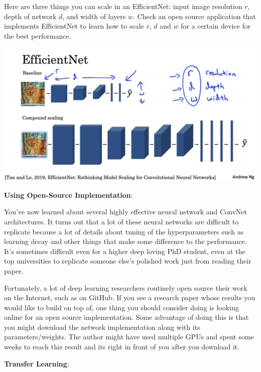 \documentclass{article}
\begin{document}
\bigskip

\noindent Here are three things you can scale in an EfficientNet: input image resolution \(r\), depth of network \(d\), and width of layers \(w\). Check an open source application that implements EfficientNet to learn how to scale \(r\), \(d\) and \(w\) for a certain device for the best performance.

\begin{center}
\includegraphics[scale=0.3]{./images/efficientnet.png}
\end{center}

\noindent \textbf{Using Open-Source Implementation}:

\noindent You've now learned about several highly effective neural network and ConvNet architectures. It turns out that a lot of these neural networks are difficult to replicate because a lot of details about tuning of the hyperparameters such as learning decay and other things that make some difference to the performance. It's sometimes difficult even for a higher deep loving PhD student, even at the top universities to replicate someone else's polished work just from reading their paper.

\bigskip

\noindent Fortunately, a lot of deep learning researchers routinely open source their work on the Internet, such as on GitHub. If you see a research paper whose results you would like to build on top of, one thing you should consider doing is looking online for an open source implementation. Some advantage of doing this is that you might download the network implementation along with its parameters/weights. The author might have used multiple GPUs and spent some weeks to reach this result and its right in front of you after you download it.

\bigskip

\noindent \textbf{Transfer Learning}:
\end{document}
